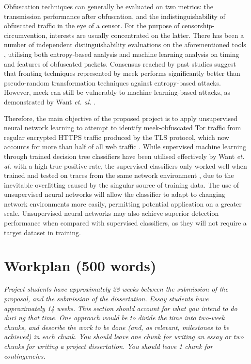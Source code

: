 \documentclass[11pt]{article}
\begin{document}
Obfuscation techniques can generally be evaluated on two metrics: the transmission performance after obfuscation, and the indistinguishability of obfuscated traffic in the eye of a censor. For the purpose of censorship-circumvention, interests are usually concentrated on the latter. There has been a number of independent distinguishability evaluations on the aforementioned tools \cite{houmansadr2013parrot} \cite{tan2015towards} \cite{wang2015seeing}, utilising both entropy-based analysis and machine learning analysis on timing and features of obfuscated packets. Consensus reached by past studies suggest that fronting techniques represented by meek performs significantly better than pseudo-random transformation techniques against entropy-based attacks. However, meek can still be vulnerably to machine learning-based attacks, as demonstrated by Want \emph{et. al.} \cite[Sec. 6]{wang2015seeing}. 

Therefore, the main objective of the proposed project is to apply unsupervised neural network learning to attempt to identify meek-obfuscated Tor traffic from regular encrypted HTTPS traffic produced by the TLS protocol, which now accounts for more than half of all web traffic \cite{encrypted-web}. While supervised machine learning through trained decision tree classifiers have been utilised effectively by Want \emph{et. al.} \cite[Tb. 8]{wang2015seeing} with a high true positive rate, the supervised classifiers only worked well when trained and tested on traces from the same network environment \cite{dixon2016network}, due to the inevitable overfitting caused by the singular source of training data. The use of unsupervised neural networks will allow the classifier to adapt to changing network environments more easily, permitting potential application on a greater scale. Unsupervised neural networks may also achieve superior detection performance when compared with supervised classifiers, as they will not require a target dataset in training.





\section{Workplan (500 words)}
\textsl{Project students have approximately 28 weeks between the submission of 
the proposal, and the submission of the dissertation. Essay students have 
approximately 14 weeks.  This section
should account for what you intend to do duri ng that time. One
approach would be to divide the time into two-week chunks, and 
describe the work to be done (and, as relevant, milestones to be 
achieved) in each chunk. You should leave one chunk for writing an essay or two 
chunks for writing a project dissertation. You should leave 1 chunk for contingencies.} 


\footnotesize{}

\newpage
\appendix
\end{document}

